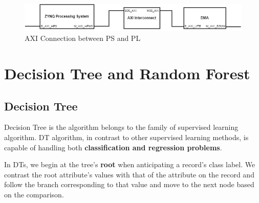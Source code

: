 \documentclass[a4paper, 12pt]{report}
\begin{document}
\begin{center}
    \begin{figure}[H]
        \begin{center}
            \includegraphics[width=14cm]{picture/AXI/pspl.drawio.png}
        \end{center}
        \caption{AXI Connection between PS and PL}
        \label{ref Figure}
    \end{figure}
\end{center}
\section{Decision Tree and Random Forest}
\subsection{Decision Tree}
Decision Tree is the algorithm belongs to the family of supervised learning algorithm. DT algorithm, in contrast to other supervised learning methods, is capable of handling both \textbf{classification and regression problems}.

In DTs, we begin at the tree's \textbf{root} when anticipating a record's class label. We contrast the root attribute's values with that of the attribute on the record and follow the branch corresponding to that value and move to the next node based on the comparison.
\end{document}
